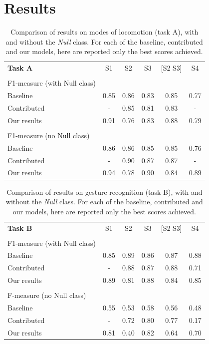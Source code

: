 
\section{Results}
\label{sec:results}

\begin{table}[]
	\begin{tabular}{lccccc}
		\textbf{Task A}				& S1	& S2	& S3	& [S2 S3]	& S4	\\
									&		&		&		&			&		\\
		F1-measure (with Null class)&		& 		&		&			& 		\\
		Baseline					& 0.85	& 0.86	& 0.83	& 0.85		& 0.77	\\
		Contributed					& -		& 0.85	& 0.81	& 0.83 		& - 	\\
		Our results					& 0.91	& 0.76	& 0.83	& 0.88		& 0.79	\\
									&		&		&		&			&		\\
		F1-measure (no Null class)	&		&		&		&			&		\\
		Baseline					& 0.86	& 0.86	& 0.85	& 0.85		& 0.76	\\
		Contributed					& -		& 0.90	& 0.87	& 0.87 		& - 	\\
		Our results					& 0.94	& 0.78	& 0.90	& 0.84		& 0.89	\\
	\end{tabular}
	\caption{Comparison of results on modes of locomotion (task A), with and without the \textit{Null} class. For each of the baseline, contributed and our models, here are reported only the best scores achieved.}
	\label{tab:res_A}
\end{table}
\begin{table}[]
	\begin{tabular}{lccccc}
		\textbf{Task B}				& S1	& S2	& S3	& [S2 S3]	& S4	\\
									&		&		&		&			&		\\
		F1-measure (with Null class)&		& 		&		&			& 		\\
		Baseline					& 0.85	& 0.89	& 0.86	& 0.87		& 0.88	\\
		Contributed					& -		& 0.88	& 0.87	& 0.88 		& 0.71 	\\
		Our results					& 0.89	& 0.81	& 0.88	& 0.84		& 0.85	\\
									&		&		&		&			&		\\
		F-measure (no Null class)	&		&		&		&			&		\\
		Baseline					& 0.55	& 0.53	& 0.58	& 0.56		& 0.48	\\
		Contributed					& -		& 0.72	& 0.80	& 0.77 		& 0.17 	\\
		Our results					& 0.81	& 0.40	& 0.82	& 0.64		& 0.70	\\
	\end{tabular}
	\caption{Comparison of results on gesture recognition (task B), with and without the \textit{Null} class. For each of the baseline, contributed and our models, here are reported only the best scores achieved.}
	\label{tab:res_B}
\end{table}

